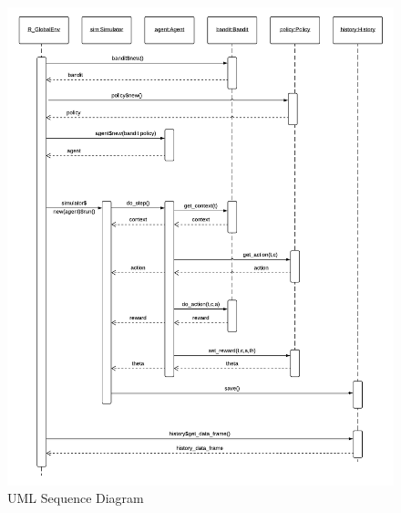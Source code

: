 \documentclass{jss}
\begin{document}
\begin{figure}[H]
  \centering
    \includegraphics[width=.99\textwidth]{fig/contextual_sequence}

      \caption{ UML Sequence Diagram}
      \label{fig:contextual_sequence}
\end{figure}
\end{document}
